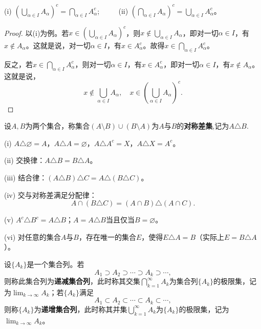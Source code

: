 \documentclass[../../main.tex]{subfiles}
\begin{document}
\begin{theorem}[De Morgan法则]\label{theorem:De Morgan法则}
  (i) \(\left(\bigcup_{\alpha\in I}A_{\alpha}\right)^c=\bigcap_{\alpha\in I}A_{\alpha}^c\); $\quad \quad$
(ii) \(\left(\bigcap_{\alpha\in I}A_{\alpha}\right)^c=\bigcup_{\alpha\in I}A_{\alpha}^c\)。  
\end{theorem}
\begin{proof}
  以(i)为例。若\(x\in\left(\bigcup_{\alpha\in I}A_{\alpha}\right)^c\)，则\(x\notin\bigcup_{\alpha\in I}A_{\alpha}\)，即对一切\(\alpha\in I\)，有\(x\notin A_{\alpha}\)。这就是说，对一切\(\alpha\in I\)，有\(x\in A_{\alpha}^c\)。故得\(x\in\bigcap_{\alpha\in I}A_{\alpha}^c\)。

反之，若\(x\in\bigcap_{\alpha\in I}A_{\alpha}^c\)，则对一切\(\alpha\in I\)，有\(x\in A_{\alpha}^c\)，即对一切\(\alpha\in I\)，有\(x\notin A_{\alpha}\)。这就是说，
\[x\notin\bigcup_{\alpha\in I}A_{\alpha}, \quad x\in\left(\bigcup_{\alpha\in I}A_{\alpha}\right)^c.\]

\end{proof}

\begin{definition}[集合的对称差]\label{definition:集合的对称差}
  设\(A,B\)为两个集合，称集合\((A\setminus B)\cup(B\setminus A)\)为\(A\)与\(B\)的\textbf{对称差集},记为\(A\triangle B\).
\end{definition}

\begin{proposition}[集合的对称差的基本性质]\label{proposition:集合的对称差的基本性质}
  (i) \(A\triangle\varnothing = A\)，\(A\triangle A=\varnothing\)，\(A\triangle A^c = X\)，\(A\triangle X = A^c\)。

(ii) 交换律：\(A\triangle B = B\triangle A\)。

(iii) 结合律：\((A\triangle B)\triangle C = A\triangle(B\triangle C)\)。

(iv) 交与对称差满足分配律：
\[A\cap(B\triangle C)=(A\cap B)\triangle(A\cap C).\]

(v) \(A^c\triangle B^c = A\triangle B\)；\(A = A\triangle B\)当且仅当\(B = \varnothing\)。

(vi) 对任意的集合\(A\)与\(B\)，存在唯一的集合\(E\)，使得\(E\triangle A = B\)（实际上\(E = B\triangle A\)）。
\end{proposition}

\begin{definition}[递增、递减集合列]\label{definition:递增、递减集合列}
设\(\{A_k\}\)是一个集合列。若
\[A_1\supset A_2\supset\cdots\supset A_k\supset\cdots,\]
则称此集合列为\textbf{递减集合列}，此时称其交集\(\bigcap_{k = 1}^{\infty}A_k\)为集合列\(\{A_k\}\)的极限集，记为\(\lim_{k\rightarrow\infty}A_k\)；若\(\{A_k\}\)满足
\[A_1\subset A_2\subset\cdots\subset A_k\subset\cdots,\]
则称\(\{A_k\}\)为\textbf{递增集合列}，此时称其并集\(\bigcup_{k = 1}^{\infty}A_k\)为\(\{A_k\}\)的极限集，记为\(\lim_{k\rightarrow\infty}A_k\)。
\end{definition}
\end{document}
